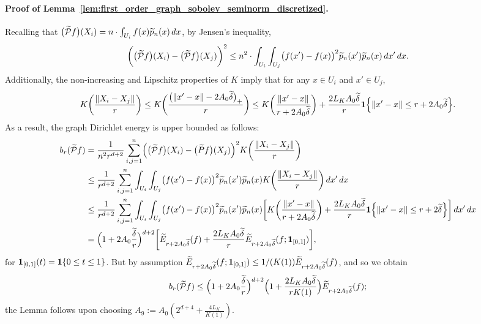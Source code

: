 \paragraph{Proof of Lemma~\ref{lem:first_order_graph_sobolev_seminorm_discretized}.}
Recalling that $\bigl(\widetilde{\mathcal{P}}f\bigr)(X_i) = n \cdot \int_{U_i} f(x) \widetilde{p}_n(x) \,dx$, by Jensen's inequality,
\begin{equation*}
\biggl(\bigl(\widetilde{\mathcal{P}}f\bigr)(X_i) - \bigl(\widetilde{\mathcal{P}}f\bigr)(X_j)\biggr)^2 \leq n^2 \cdot \int_{U_i} \int_{U_j} \bigl(f(x') - f(x)\bigr)^2 \widetilde{p}_n(x') \widetilde{p}_n(x) \,dx' \,dx.
\end{equation*}
Additionally, the non-increasing and Lipschitz properties of $K$ imply that for any $x \in U_i$ and $x' \in U_j$, 
\begin{equation*}
K\biggl(\frac{\|X_i - X_j\|}{r}\biggr) \leq K\biggl(\frac{\bigl(\|x' - x\| - 2A_0\widetilde{\delta}\bigr)_{+}}{r}\biggr) \leq K\biggl(\frac{\|x' - x\|}{r + 2A_0\widetilde{\delta}}\biggr) + \frac{2L_KA_0\widetilde{\delta}}{r}\mathbf{1}\Bigl\{\|x' - x\| \leq r + 2A_0\widetilde{\delta}\Bigr\}.
\end{equation*}
As a result, the graph Dirichlet energy is upper bounded as follows:
\begin{align*}
b_r(\widetilde{\mathcal{P}}f) & = \frac{1}{n^2r^{d + 2}} \sum_{i,j = 1}^n \Bigl(\bigl(\widetilde{\mathcal{P}}f\bigr)(X_i) - \bigl(\widetilde{P}f\bigr)(X_j)\Bigr)^2 K\biggl(\frac{\|X_i - X_j\|}{r}\biggr) \\
& \leq \frac{1}{r^{d + 2}} \sum_{i,j = 1}^n \int_{U_i} \int_{U_j}  \bigl(f(x') - f(x)\bigr)^2 \widetilde{p}_n(x') \widetilde{p}_n(x) K\biggl(\frac{\|X_i - X_j\|}{r}\biggr) \,dx' \,dx \\
& \leq \frac{1}{r^{d + 2}} \sum_{i,j = 1}^n \int_{U_i} \int_{U_j}  \bigl(f(x') - f(x)\bigr)^2 \widetilde{p}_n(x') \widetilde{p}_n(x) \biggl[K\biggl(\frac{\|x' - x\|}{r + 2A_0\widetilde{\delta}}\biggr) + \frac{2L_KA_0\widetilde{\delta}}{r}\mathbf{1}\Bigl\{\|x' - x\| \leq r + 2\widetilde{\delta}\Bigr\}\biggr] \,dx' \,dx \\
& = \Bigl(1 + 2A_0\frac{\widetilde{\delta}}{r}\Bigr)^{d + 2}\biggl[\widetilde{E}_{r + 2A_0\widetilde{\delta}}(f) + \frac{2L_KA_0\widetilde{\delta}}{r}\widetilde{E}_{r + 2A_0\widetilde{\delta}}(f; \mathbf{1}_{[0,1]})\biggr],
\end{align*}
for $\mathbf{1}_{[0,1]}(t) = \mathbf{1}\{0 \leq t \leq 1\}$. But by assumption $\widetilde{E}_{r + 2A_0\widetilde{\delta}}(f; \mathbf{1}_{[0,1]}) \leq 1/(K(1))\widetilde{E}_{r + 2A_0\widetilde{\delta}}(f)$, and so we obtain
\begin{equation*}
b_r(\widetilde{\mathcal{P}}f) \leq \Bigl(1 + 2A_0\frac{\widetilde{\delta}}{r}\Bigr)^{d + 2} \Bigl(1 + \frac{2L_KA_0\widetilde{\delta}}{rK(1)}\Bigr) \widetilde{E}_{r + 2A_0\widetilde{\delta}}(f);
\end{equation*}
the Lemma follows upon choosing $A_9 := A_0(2^{d + 4} + \frac{4L_K}{K(1)})$.

